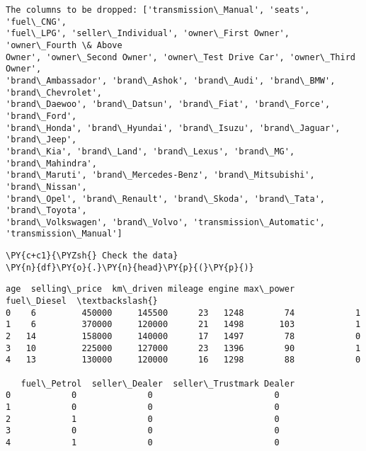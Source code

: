 \begin{Verbatim}[commandchars=\\\{\}]
The columns to be dropped: ['transmission\_Manual', 'seats', 'fuel\_CNG',
'fuel\_LPG', 'seller\_Individual', 'owner\_First Owner', 'owner\_Fourth \& Above
Owner', 'owner\_Second Owner', 'owner\_Test Drive Car', 'owner\_Third Owner',
'brand\_Ambassador', 'brand\_Ashok', 'brand\_Audi', 'brand\_BMW', 'brand\_Chevrolet',
'brand\_Daewoo', 'brand\_Datsun', 'brand\_Fiat', 'brand\_Force', 'brand\_Ford',
'brand\_Honda', 'brand\_Hyundai', 'brand\_Isuzu', 'brand\_Jaguar', 'brand\_Jeep',
'brand\_Kia', 'brand\_Land', 'brand\_Lexus', 'brand\_MG', 'brand\_Mahindra',
'brand\_Maruti', 'brand\_Mercedes-Benz', 'brand\_Mitsubishi', 'brand\_Nissan',
'brand\_Opel', 'brand\_Renault', 'brand\_Skoda', 'brand\_Tata', 'brand\_Toyota',
'brand\_Volkswagen', 'brand\_Volvo', 'transmission\_Automatic',
'transmission\_Manual']
\end{Verbatim}
\begin{tcolorbox}[breakable, size=fbox, boxrule=1pt, pad at break*=1mm,colback=cellbackground, colframe=cellborder]
\begin{Verbatim}[commandchars=\\\{\}]
\PY{c+c1}{\PYZsh{} Check the data}
\PY{n}{df}\PY{o}{.}\PY{n}{head}\PY{p}{(}\PY{p}{)}
\end{Verbatim}
\end{tcolorbox}
    
\begin{tcolorbox}[breakable, size=fbox, boxrule=.5pt, pad at break*=1mm, opacityfill=0]
\begin{Verbatim}[commandchars=\\\{\}]
   age  selling\_price  km\_driven mileage engine max\_power  fuel\_Diesel  \textbackslash{}
0    6         450000     145500      23   1248        74            1
1    6         370000     120000      21   1498       103            1
2   14         158000     140000      17   1497        78            0
3   10         225000     127000      23   1396        90            1
4   13         130000     120000      16   1298        88            0

   fuel\_Petrol  seller\_Dealer  seller\_Trustmark Dealer
0            0              0                        0
1            0              0                        0
2            1              0                        0
3            0              0                        0
4            1              0                        0
\end{Verbatim}
\end{tcolorbox}


